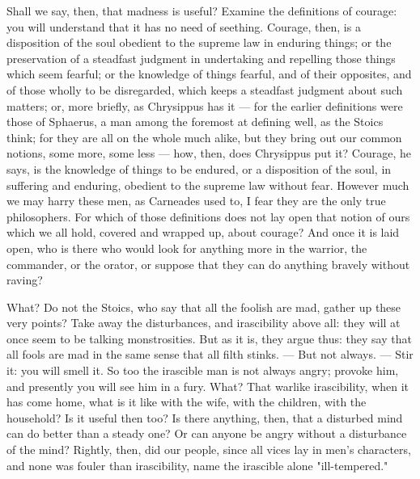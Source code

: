  Shall we say, then, that madness is useful? Examine the definitions of courage: you will understand that it has no need of seething. Courage, then, is a disposition of the soul obedient to the supreme law in enduring things; or the preservation of a steadfast judgment in undertaking and repelling those things which seem fearful; or the knowledge of things fearful, and of their opposites, and of those wholly to be disregarded, which keeps a steadfast judgment about such matters; or, more briefly, as Chrysippus has it — for the earlier definitions were those of Sphaerus, a man among the foremost at defining well, as the Stoics think; for they are all on the whole much alike, but they bring out our common notions, some more, some less — how, then, does Chrysippus put it? Courage, he says, is the knowledge of things to be endured, or a disposition of the soul, in suffering and enduring, obedient to the supreme law without fear. However much we may harry these men, as Carneades used to, I fear they are the only true philosophers. For which of those definitions does not lay open that notion of ours which we all hold, covered and wrapped up, about courage? And once it is laid open, who is there who would look for anything more in the warrior, the commander, or the orator, or suppose that they can do anything bravely without raving?

 What? Do not the Stoics, who say that all the foolish are mad, gather up these very points? Take away the disturbances, and irascibility above all: they will at once seem to be talking monstrosities. But as it is, they argue thus: they say that all fools are mad in the same sense that all filth stinks. — But not always. — Stir it: you will smell it. So too the irascible man is not always angry; provoke him, and presently you will see him in a fury. What? That warlike irascibility, when it has come home, what is it like with the wife, with the children, with the household? Is it useful then too? Is there anything, then, that a disturbed mind can do better than a steady one? Or can anyone be angry without a disturbance of the mind? Rightly, then, did our people, since all vices lay in men's characters, and none was fouler than irascibility, name the irascible alone "ill-tempered."

